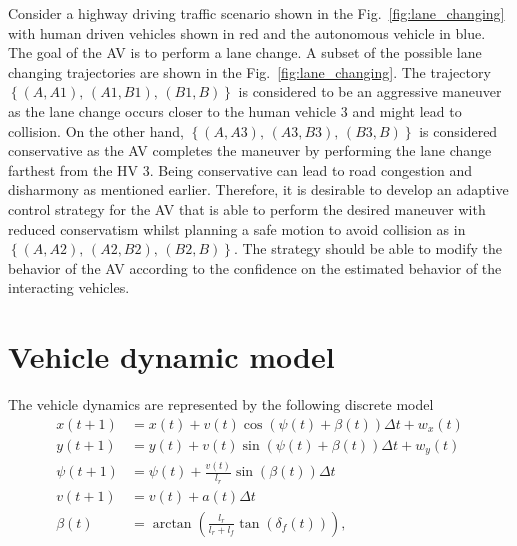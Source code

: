 \documentclass[10pt,journal]{IEEEtran}
\begin{document}
	Consider a highway driving traffic scenario shown in the Fig.~\ref{fig:lane_changing} with human driven vehicles shown in red and the autonomous vehicle in blue. The goal of the AV is to perform a lane change. A subset of the possible lane changing trajectories are shown in the Fig.~\ref{fig:lane_changing}. The trajectory $\left\{\left(A,A1\right),\,\left(A1,B1\right),\,\left(B1,B\right)\right\}$ is considered to be an aggressive maneuver as the lane change occurs closer to the human vehicle $3$ and might lead to collision. On the other hand, $\left\{\left(A,A3\right),\,\left(A3,B3\right),\,\left(B3,B\right)\right\}$ is considered conservative as the AV completes the maneuver by performing the lane change farthest from the HV 3. Being conservative can lead to road congestion and disharmony as mentioned earlier. Therefore, it is desirable to develop an adaptive control strategy for the AV that is able to perform the desired maneuver with reduced conservatism whilst planning a safe motion to avoid collision as in $\left\{\left(A,A2\right),\,\left(A2,B2\right),\,\left(B2,B\right)\right\}$. The strategy should be able to  modify the behavior of the AV according to the confidence on the estimated behavior of the interacting vehicles. 
	
	
	
	

	\section{Vehicle dynamic model}
	\label{sec:model}

	The  vehicle dynamics are represented by the following discrete model \cite{Kong2015}
	\begin{subequations}
		\begin{align}
			x\left(t+1\right) & = 	x\left(t\right) + v\left(t\right) \cos\left(\psi \left(t\right) + \beta \left(t\right) \right) \Delta t + w_x\left(t\right)\\ 
			y\left(t+1\right) & = 	y\left(t\right) + v\left(t\right) \sin\left(\psi \left(t\right) + \beta \left(t\right) \right) \Delta t + w_y\left(t\right) \\ 
			\psi\left(t+1\right) & = 	\psi\left(t\right) + \frac{v\left(t\right)}{l_r} \sin\left( \beta \left(t\right) \right) \Delta t \\ 
			v\left(t+1\right) & = 	v\left(t\right) + a\left(t\right)  \Delta t\\
			\beta\left(t\right) & = \arctan\left(\frac{l_r}{l_r+l_f}\tan\left(\delta_f\left(t\right)\right)\right),
		\end{align}
	\label{eq:mod}
	\end{subequations}
\end{document}
